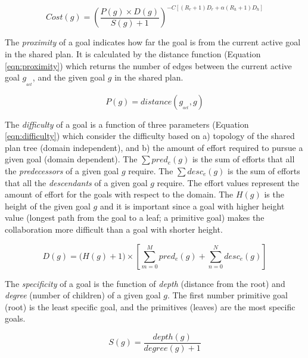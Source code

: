 \documentclass[conference]{IEEEtran}
\begin{document}
\vspace*{-4mm}
\begin{equation}
Cost(g) = \left(\frac{P(g)\times D(g)}{S(g)+1}\right)^{-C[(R_r+1)D_r + \alpha
(R_h+1)D_h]}
\label{eqn:cost}
\end{equation}

The \textit{proximity} of a goal indicates how far the goal is from the current
active goal in the shared plan. It is calculated by the distance function
(Equation \ref{eqn:proximity}) which returns the number of edges between the
current active goal $g_{_{act}}$, and the given goal $g$ in the shared plan.

\vspace*{-3mm}
\begin{equation}
P(g) =  distance(g_{_{act}},g)
\label{eqn:proximity}
\end{equation}

The \textit{difficulty} of a goal is a function of three parameters (Equation
\ref{eqn:difficulty}) which consider the difficulty based on a) topology of the
shared plan tree (domain independent), and b) the amount of effort required to
pursue a given goal (domain dependent). The $\sum pred_e(g)$ is the sum of
efforts that all the \textit{predecessors} of a given goal $g$ require. The
$\sum desc_e(g)$ is the sum of efforts that all the \textit{descendants} of a
given goal $g$ require. The effort values represent the amount of effort for the
goals with respect to the domain. The $H(g)$ is the height of the given goal $g$
and it is important since a goal with higher height value (longest path from the
goal to a leaf; a primitive goal) makes the collaboration more difficult than a
goal with shorter height.

\vspace*{-7mm}
\begin{equation}
D(g) = \Big(H(g)+1\Big)\times\left[\sum\limits_{m=0}^{M} pred_e(g) +
\sum\limits_{n=0}^{N} desc_e(g)\right]
\label{eqn:difficulty}
\end{equation}

The \textit{specificity} of a goal is the function of \textit{depth} (distance
from the root) and \textit{degree} (number of children) of a given goal $g$. The
first number primitive goal (root) is the least specific goal, and the
primitives (leaves) are the most specific goals.

\vspace*{-3mm}
\begin{equation}
S(g) = \frac{depth(g)}{degree(g)+1}
\label{eqn:specificity}
\end{equation}
\end{document}
